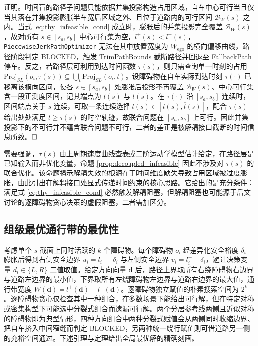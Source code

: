 \documentclass[a4paper,11pt]{ctexart}
\theoremstyle{definition}
\begin{document}
证明。时间盲的路径子问题只能依据并集投影构造占用区域，自车中心可行当且仅当其落在并集投影膨胀半车宽后区域之外、且位于道路内的可行区间 $\mathcal{B}_{W}(s)$ 之内。当式 \eqref{eq:thy_infeasible_cond} 成立时，膨胀后的并集投影完全覆盖 $\mathcal{B}_{W}(s)$，故对所有 $s \in [s_a, s_b]$ 中心可行集为空，$l^{+}(s) < l^{-}(s)$，\texttt{PiecewiseJerkPathOptimizer} 无法在其中放置宽度为 $W_{\text{ego}}$ 的横向偏移曲线，路径阶段判定 BLOCKED，触发 TrimPathBounds 截断路径并回退至 FallbackPath 停车。反之，若路径层可利用到达时间函数 $\tau(s)$，则只需查询单一时刻的占用 $\mathrm{Proj}_{SL}(o_i, \tau(s)) \subseteq \bigcup_t \mathrm{Proj}_{SL}(o_i, t)$。设障碍物在自车实际到达时刻 $\tau(\cdot)$ 已移离该横向区间，使各 $s \in [s_a, s_b]$ 处膨胀后投影不再覆盖 $\mathcal{B}_{W}(s)$、中心可行集含一段正测度区间，记其端点为 $\underline{l}(s)$ 与 $\overline{l}(s)$。在 $\tau(\cdot)$ 沿 $[s_a, s_b]$ 连续时，区间端点关于 $s$ 连续，可取一条连续选择 $l(s) \in [\underline{l}(s), \overline{l}(s)]$，配合 $\tau(s)$ 给出处处满足 $t \geq \tau(s)$ 的时空轨迹，故联合问题在 $[s_a, s_b]$ 上可行。因此并集投影下的不可行并不蕴含联合问题不可行，二者的差正是被解耦接口截断的时间信息所致。$\hfill\Box$

需要强调，$\tau(s)$ 由上周期速度曲线查表或二阶运动学模型估计给定，在路径层是已知输入而非优化变量，命题 \ref{prop:decoupled_infeasible} 因此不涉及对 $\tau(s)$ 的联合优化。该命题揭示解耦失效的根源在于时间维度缺失导致占用区域被过度膨胀，由此引出在解耦接口处显式传递时间约束的核心思路。它给出的是充分条件：满足式 \eqref{eq:thy_infeasible_cond} 必然触发解耦阻塞，但解耦阻塞也可能源于后文讨论的逐障碍物贪心决策的虚假阻塞，二者需加区分。

\subsection{组级最优通行带的最优性}
\label{sec:thy_max_gap}

考虑单个 $s$ 截面上同时活跃的 $k$ 个障碍物。每个障碍物 $o_i$ 经差异化安全裕度 $\delta_i$ 膨胀后得到右侧安全边界 $u_i = l_i^{-} - \delta_i$ 与左侧安全边界 $v_i = l_i^{+} + \delta_i$，避让决策变量 $d_i \in \{L, R\}$ 二值取值。给定方向向量 $\mathbf{d}$ 后，路径上界取所有右绕障碍物右边界与道路左边界的最小值，下界取所有左绕障碍物左边界与道路右边界的最大值，通行带宽度 $W(\mathbf{d}) = l^{+}(\mathbf{d}) - l^{-}(\mathbf{d})$。逐障碍物独立赋值的朴素搜索空间为 $2^k$。逐障碍物贪心仅检查其中一种组合，在多数场景下能给出可行解，但在特定对称或密集构型下可能选中分裂式组合而遗漏可行解。两个分居参考线两侧且近似对称的障碍物即为典型情形，四种方向组合中两种分裂式赋值会从两侧同时收缩边界、把自车挤入中间窄缝而判定 BLOCKED，另两种统一绕行赋值则可借道路另一侧的充裕空间通过。下述引理与定理给出全局最优解的精确刻画。
\end{document}
